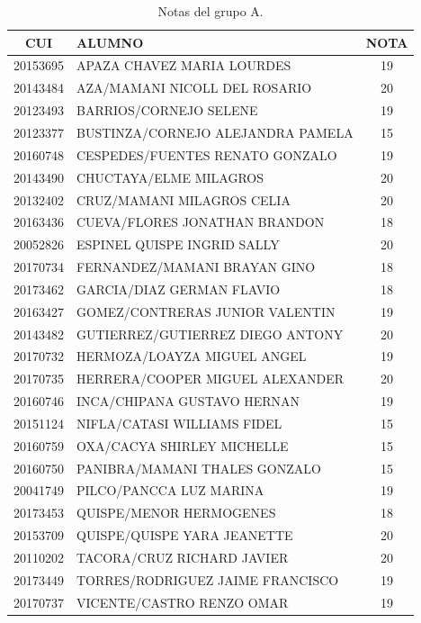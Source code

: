         \begin{table}[H]
        \centering
            \caption{Notas del grupo A.}
            \begin{tabular}{|c|p{10cm}|c|}
                \hline 
                \textbf{CUI} & \textbf{ALUMNO} & \textbf{NOTA}  \\ \hline
        20153695 & APAZA CHAVEZ MARIA LOURDES & 19 \\ \hline 
            20143484 & AZA/MAMANI NICOLL DEL ROSARIO & 20 \\ \hline 
            20123493 & BARRIOS/CORNEJO SELENE & 19 \\ \hline 
            20123377 & BUSTINZA/CORNEJO ALEJANDRA PAMELA & 15 \\ \hline 
            20160748 & CESPEDES/FUENTES RENATO GONZALO & 19 \\ \hline 
            20143490 & CHUCTAYA/ELME MILAGROS & 20 \\ \hline 
            20132402 & CRUZ/MAMANI MILAGROS CELIA & 20 \\ \hline 
            20163436 & CUEVA/FLORES JONATHAN BRANDON & 18 \\ \hline 
            20052826 & ESPINEL QUISPE INGRID SALLY & 20 \\ \hline 
            20170734 & FERNANDEZ/MAMANI BRAYAN GINO & 18 \\ \hline 
            20173462 & GARCIA/DIAZ GERMAN FLAVIO & 18 \\ \hline 
            20163427 & GOMEZ/CONTRERAS JUNIOR VALENTIN & 19 \\ \hline 
            20143482 & GUTIERREZ/GUTIERREZ DIEGO ANTONY & 20 \\ \hline 
            20170732 & HERMOZA/LOAYZA MIGUEL ANGEL & 19 \\ \hline 
            20170735 & HERRERA/COOPER MIGUEL ALEXANDER & 20 \\ \hline 
            20160746 & INCA/CHIPANA GUSTAVO HERNAN & 19 \\ \hline 
            20151124 & NIFLA/CATASI WILLIAMS FIDEL & 15 \\ \hline 
            20160759 & OXA/CACYA SHIRLEY MICHELLE & 15 \\ \hline 
            20160750 & PANIBRA/MAMANI THALES GONZALO & 15 \\ \hline 
            20041749 & PILCO/PANCCA LUZ MARINA & 19 \\ \hline 
            20173453 & QUISPE/MENOR HERMOGENES & 18 \\ \hline 
            20153709 & QUISPE/QUISPE YARA JEANETTE & 20 \\ \hline 
            20110202 & TACORA/CRUZ RICHARD JAVIER & 20 \\ \hline 
            20173449 & TORRES/RODRIGUEZ JAIME FRANCISCO & 19 \\ \hline 
            20170737 & VICENTE/CASTRO RENZO OMAR & 19 \\ \hline 
            		
            \end{tabular}
        \end{table}	
        